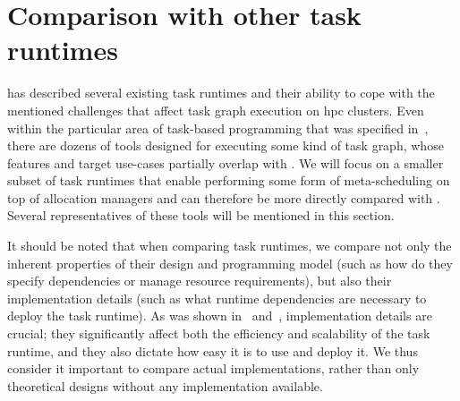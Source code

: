 \section{Comparison with other task runtimes}
\label{hq:related-work}
 has described several existing task runtimes and their ability to cope
with the mentioned challenges that affect task graph execution on \gls{hpc} clusters.
Even within the particular area of task-based programming that was specified
in~, there are dozens of tools designed for executing some kind of task
graph, whose features and target use-cases partially overlap with \hyperqueue{}. We will
focus on a smaller subset of task runtimes that enable performing some form of meta-scheduling on
top of allocation managers and can therefore be more directly compared with
\hyperqueue{}. Several representatives of these tools will be mentioned in this section.

It should be noted that when comparing task runtimes, we compare not only the inherent properties
of their design and programming model (such as how do they specify dependencies or manage resource
requirements), but also their implementation details (such as what runtime dependencies are
necessary to deploy the task runtime). As was shown in~
and~, implementation details are crucial; they significantly affect both the
efficiency and scalability of the task runtime, and they also dictate how easy it is to use and
deploy it. We thus consider it important to compare actual implementations, rather than only
theoretical designs without any implementation available.



